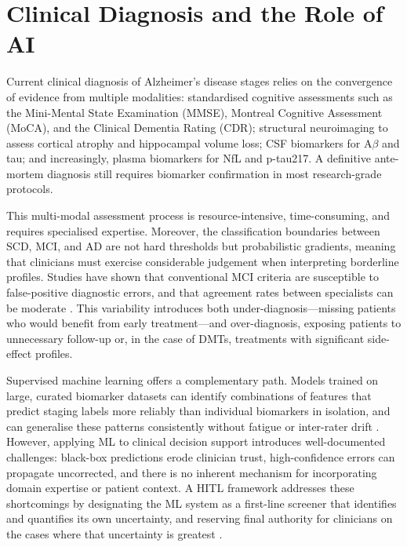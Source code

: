 \documentclass[12pt, a4paper]{report}
\begin{document}
  \section{Clinical Diagnosis and the Role of AI}
  \label{sec:clinical-diagnosis}

  Current clinical diagnosis of Alzheimer's disease stages relies on the convergence
  of evidence from multiple modalities: standardised cognitive assessments such as
  the Mini-Mental State Examination (MMSE), Montreal Cognitive Assessment (MoCA),
  and the Clinical Dementia Rating (CDR); structural neuroimaging to assess cortical
  atrophy and hippocampal volume loss; CSF biomarkers for A$\beta$ and tau; and
  increasingly, plasma biomarkers for NfL and p-tau217. A definitive ante-mortem
  diagnosis still requires biomarker confirmation in most research-grade protocols.

  This multi-modal assessment process is resource-intensive, time-consuming, and
  requires specialised expertise. Moreover, the classification boundaries between
  SCD, MCI, and AD are not hard thresholds but probabilistic gradients, meaning that
  clinicians must exercise considerable judgement when interpreting borderline profiles.
  Studies have shown that conventional MCI criteria are susceptible to false-positive
  diagnostic errors, and that agreement rates between specialists can be moderate
  \citep{edmonds2015mci}. This variability introduces both under-diagnosis---missing
  patients who would benefit from early treatment---and over-diagnosis, exposing
  patients to unnecessary follow-up or, in the case of DMTs, treatments with
  significant side-effect profiles.

  Supervised machine learning offers a complementary path. Models trained on large,
  curated biomarker datasets can identify combinations of features that predict staging
  labels more reliably than individual biomarkers in isolation, and can generalise
  these patterns consistently without fatigue or inter-rater drift
  \citep{rathore2017review}. However, applying ML to clinical decision support
  introduces well-documented challenges: black-box predictions erode clinician trust,
  high-confidence errors can propagate uncorrected, and there is no inherent mechanism
  for incorporating domain expertise or patient context. A HITL framework addresses
  these shortcomings by designating the ML system as a first-line screener that
  identifies and quantifies its own uncertainty, and reserving final authority for
  clinicians on the cases where that uncertainty is greatest \citep{topol2019highperformance}.
\end{document}
